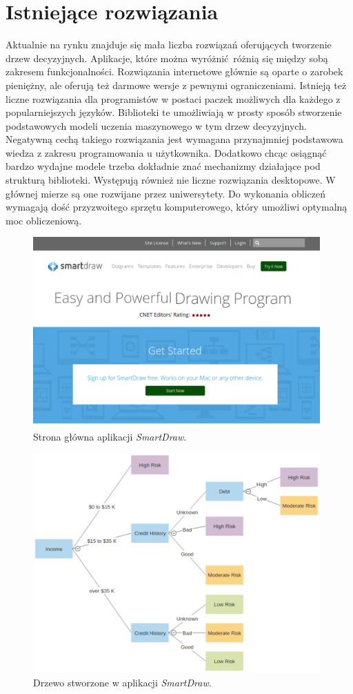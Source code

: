 \section{Istniejące rozwiązania}
Aktualnie na rynku znajduje się mała liczba rozwiązań oferujących tworzenie drzew decyzyjnych. Aplikacje, które można wyróżnić różnią się między sobą zakresem funkcjonalności. Rozwiązania internetowe głównie są oparte o zarobek pieniężny, ale oferują też darmowe wersje z pewnymi ograniczeniami. Istnieją też liczne rozwiązania dla programistów w postaci paczek możliwych dla każdego z popularniejszych języków. Biblioteki te umożliwiają w prosty sposób stworzenie podstawowych modeli uczenia maszynowego w tym drzew decyzyjnych. Negatywną cechą takiego rozwiązania jest wymagana przynajmniej podstawowa wiedza z zakresu programowania u użytkownika. Dodatkowo chcąc osiągnąć bardzo wydajne modele trzeba dokładnie znać mechanizmy działające pod strukturą biblioteki. Występują również nie liczne rozwiązania desktopowe. W głównej mierze są one rozwijane przez uniwersytety. Do wykonania obliczeń wymagają dość przyzwoitego sprzętu komputerowego, który umożliwi optymalną moc obliczeniową.    

\begin{figure}[htb]
	\centering
	\includegraphics[width=11cm]{grafika/smartdraw.eps}
	\caption{Strona główna aplikacji \textit{SmartDraw}.}
	\label{rys21_smartdraw}
\end{figure}

\begin{figure}[htb]
	\centering
	\includegraphics[width=11cm]{grafika/smartdraw_tree.eps}
	\caption{Drzewo stworzone w aplikacji \textit{SmartDraw}.}
	\label{rys22_smartdraw_tree}
\end{figure}


